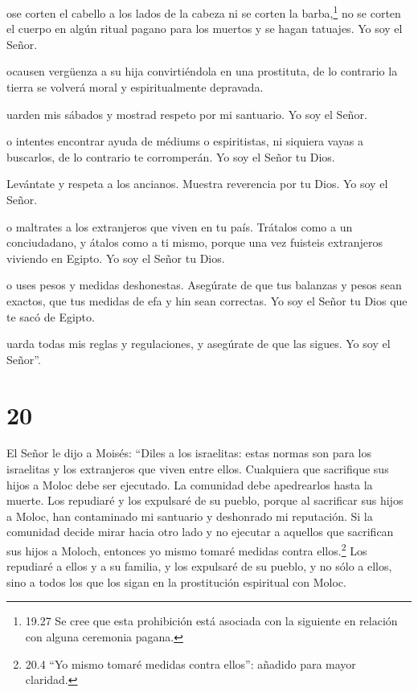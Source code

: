  ose corten el cabello a los lados de la cabeza ni se
corten la barba,\footnote{19.27 Se cree que esta prohibición está
  asociada con la siguiente en relación con alguna ceremonia pagana.}
 no se corten el cuerpo en algún ritual pagano para los
muertos y se hagan tatuajes. Yo soy el Señor.

 ocausen vergüenza a su hija convirtiéndola en una
prostituta, de lo contrario la tierra se volverá moral y espiritualmente
depravada.

 uarden mis sábados y mostrad respeto por mi santuario. Yo
soy el Señor.

 o intentes encontrar ayuda de médiums o espiritistas, ni
siquiera vayas a buscarlos, de lo contrario te corromperán. Yo soy el
Señor tu Dios.

 Levántate y respeta a los ancianos. Muestra reverencia por
tu Dios. Yo soy el Señor.

 o maltrates a los extranjeros que viven en tu país.
 Trátalos como a un conciudadano, y átalos como a ti mismo,
porque una vez fuisteis extranjeros viviendo en Egipto. Yo soy el Señor
tu Dios.

 o uses pesos y medidas deshonestas. 
Asegúrate de que tus balanzas y pesos sean exactos, que tus medidas de
efa y hin sean correctas. Yo soy el Señor tu Dios que te sacó de Egipto.

 uarda todas mis reglas y regulaciones, y asegúrate de que
las sigues. Yo soy el Señor''.

\hypertarget{section-19}{%
\section{20}\label{section-19}}

 El Señor le dijo a Moisés:  ``Diles a los
israelitas: estas normas son para los israelitas y los extranjeros que
viven entre ellos. Cualquiera que sacrifique sus hijos a Moloc debe ser
ejecutado. La comunidad debe apedrearlos hasta la muerte. 
Los repudiaré y los expulsaré de su pueblo, porque al sacrificar sus
hijos a Moloc, han contaminado mi santuario y deshonrado mi reputación.
 Si la comunidad decide mirar hacia otro lado y no ejecutar
a aquellos que sacrifican sus hijos a Moloch, entonces yo mismo tomaré
medidas contra ellos.\footnote{20.4 ``Yo mismo tomaré medidas contra
  ellos'': añadido para mayor claridad.}  Los repudiaré a
ellos y a su familia, y los expulsaré de su pueblo, y no sólo a ellos,
sino a todos los que los sigan en la prostitución espiritual con Moloc.

